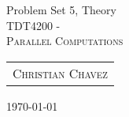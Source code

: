 \documentclass[fontsize=11pt, paper=a4, titlepage]{article}
\begin{document}
\begin{center}

{\huge Problem Set 5, Theory}\\[0.5cm]

\textsc{\LARGE TDT4200 -}\\[0.5cm]
\textsc{\large Parallel Computations}\\[1.0cm]

\begin{table}[h]
    \centering
    \begin{tabular}{c}
        \textsc{Christian Chavez}
    \end{tabular}
\end{table}

\end{center}
\vfill
\hfill \large{\today}
\clearpage
\end{document}
